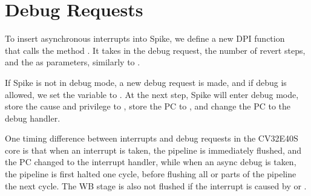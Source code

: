 \section{Debug Requests}


\begin{sloppy}
To insert asynchronous interrupts into Spike, we define a new DPI function\\  that calls the method . It takes in the debug request, the number of revert steps, and the  as parameters, similarly to . 
\end{sloppy}

If Spike is not in debug mode, a new debug request is made, and if debug is allowed, we set the  variable to . At the next step, Spike will enter debug mode, store the cause and privilege to , store the PC to , and change the PC to the debug handler.

One timing difference between interrupts and debug requests in the CV32E40S core is that when an interrupt is taken, the pipeline is immediately flushed, and the PC changed to the interrupt handler, while when an async debug is taken, the pipeline is first halted one cycle, before flushing all or parts of the pipeline the next cycle. The WB stage is also not flushed if the interrupt is caused by  or .




